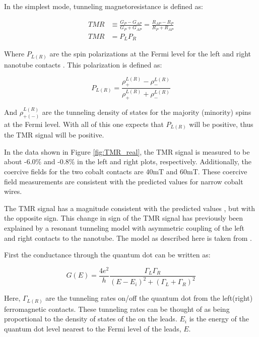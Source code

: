 In the simplest mode, tunneling magnetoresistance is defined as:

\begin{align}
    TMR &\equiv \frac{G_P - G_{AP}}{G_P + G_{AP}} = \frac{R_{AP} - R_{P}}{R_P + R_{AP}} \\
    TMR &= P_L P_R \label{eq:basic_tmr}
\end{align}

Where $P_{L(R)}$ are the spin polarizations at the Fermi level for the left and right nanotube contacts \cite{Maekawa1982}. This polarization is defined as:

\begin{equation}
    P_{L(R)} = \frac{\rho^{L(R)}_{+} - \rho^{L(R)}_{-}}{\rho^{L(R)}_{+} + \rho^{L(R)}_{-}}
\end{equation}

And $\rho^{L(R)}_{+(-)}$ are the tunneling density of states for the majority (minority) spins at the Fermi level. With all of this one expects that $P_{L(R)}$ will be positive, thus the TMR signal will be positive.

In the data shown in Figure \ref{fig:TMR_real}, the TMR signal is measured to be about -6.0\% and -0.8\% in the left and right plots, respectively. Additionally, the coercive fields for the two cobalt contacts are 40mT and 60mT. These coercive field measurements are consistent with the predicted values for narrow cobalt wires.

The TMR signal has a magnitude consistent with the predicted values \cite{Maekawa1982}, but with the opposite sign. This change in sign of the TMR signal has previously been explained by a resonant tunneling model with asymmetric coupling of the left and right contacts to the nanotube. The model as described here is taken from \cite{Tsymbal2003}.

First the conductance through the quantum dot can be written as:

\begin{equation}
\label{eq:tunnel_conductance}
    G(E) = \frac{4e^2}{h} \frac{\Gamma_L \Gamma_R}{(E-E_i)^2 + (\Gamma_L + \Gamma_R)^2}
\end{equation}

Here, $\Gamma_{L(R)}$ are the tunneling rates on/off the quantum dot from the left(right) ferromagnetic contacts. These tunneling rates can be thought of as being proportional to the density of states of the on the leads. $E_i$ is the energy of the quantum dot level nearest to the Fermi level of the leads, $E$. 

